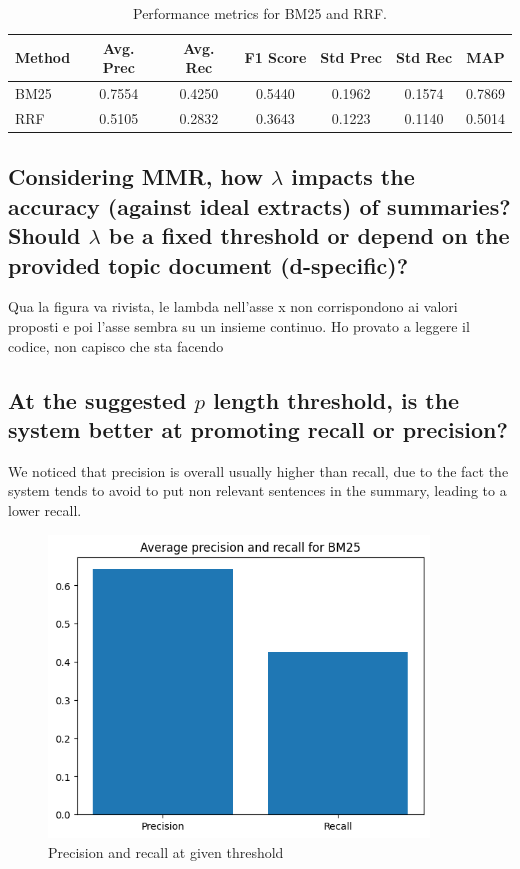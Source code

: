 \begin{center}
    \begin{table}[H]
        \centering
        \begin{tabular}{|l|c|c|c|c|c|c|}
            \hline
            Method & Avg. Prec & Avg. Rec & F1 Score & Std Prec & Std Rec & MAP    \\
            \hline
            BM25   & 0.7554    & 0.4250   & 0.5440   & 0.1962   & 0.1574  & 0.7869 \\
            \hline
            RRF    & 0.5105    & 0.2832   & 0.3643   & 0.1223   & 0.1140  & 0.5014 \\
            \hline
        \end{tabular}
        \caption{Performance metrics for BM25 and RRF.}
        \label{tab:bm25_rrf}
    \end{table}
\end{center}

\subsection{Considering MMR, how $\lambda$ impacts the accuracy (against ideal extracts) of summaries? Should $\lambda$ be a fixed threshold or depend on the provided topic document (d-specific)?}
Qua la figura va rivista, le lambda nell'asse x non corrispondono ai valori
proposti e poi l'asse sembra su un insieme continuo. Ho provato a leggere il
codice, non capisco che sta facendo
\subsection{At the suggested $p$ length threshold, is the system better at promoting recall or precision?}
We noticed that precision is overall usually higher than recall, due to the fact the system tends to avoid to put non relevant sentences in the summary, leading to a lower recall.

\begin{figure}[h]
    \centering
    \includegraphics[width=0.9\textwidth]{images/pre_rec.png}
    \caption{Precision and recall at given threshold}
    \label{fig:Precision and recall}
\end{figure}